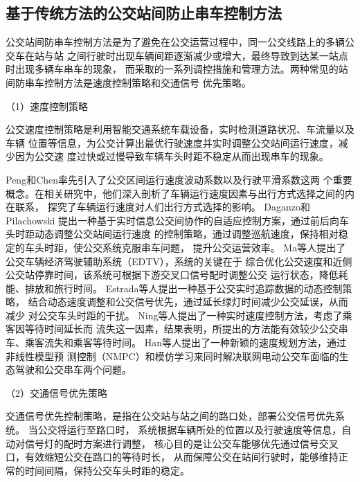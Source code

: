 \subsection{基于传统方法的公交站间防止串车控制方法}
公交站间防串车控制方法是为了避免在公交运营过程中，同一公交线路上的多辆公交车在站与站
之间行驶时出现车辆间距逐渐减少或增大，最终导致到达某一站点时出现多辆车串车的现象，
而采取的一系列调控措施和管理方法。两种常见的站间防串车控制方法是速度控制策略和交通信号
优先策略。

（1）速度控制策略

公交速度控制策略是利用智能交通系统车载设备，实时检测道路状况、车流量以及车辆
位置等信息，为公交计算出最优行驶速度并实时调整公交站间运行速度，减少因为公交速
度过快或过慢导致车辆车头时距不稳定从而出现串车的现象。

Peng和Chen\cite{peng2008improving}率先引入了公交区间运行速度波动系数以及行驶平滑系数这两
个重要概念。在相关研究中，他们深入剖析了车辆运行速度因素与出行方式选择之间的内在联系，
探究了车辆运行速度对人们出行方式选择的影响。
Daganzo和Pilachowski\cite{daganzo2011reducing}
提出一种基于实时信息公交间协作的自适应控制方案，通过前后向车头时距动态调整公交站间运行速度
的控制策略，通过调整巡航速度，保持相对稳定的车头时距，使公交系统克服串车问题，
提升公交运营效率。
Ma等人\cite{ma2012development}提出了公交车辆经济驾驶辅助系统（EDTV），系统的关键在于
综合优化公交速度和近侧公交站停靠时间，该系统可根据下游交叉口信号配时调整公交
运行状态，降低耗能、排放和旅行时间。
Estrada等人\cite{estrada2016bus}提出一种基于公交实时追踪数据的动态控制策略，
结合动态速度调整和公交信号优先，通过延长绿灯时间减少公交延误，从而减少
对公交车头时距的干扰。
Ning等人\cite{ning2024accounting}提出了一种实时速度控制方法，考虑了乘客因等待时间延长而
流失这一因素，结果表明，所提出的方法能有效较少公交串车、乘客流失和乘客等待时间。
Han等人\cite{han2025speed}提出了一种新颖的速度规划方法，通过非线性模型预
测控制（NMPC）和模仿学习来同时解决联网电动公交车面临的生态驾驶和公交串车两个问题。

（2）交通信号优先策略

交通信号优先控制策略，是指在公交站与站之间的路口处，部署公交信号优先系统。
当公交将运行至路口时，
系统根据车辆所处的位置以及行驶速度等信息，自动对信号灯的配时方案进行调整，
核心目的是让公交车能够优先通过信号交叉口，有效缩短公交在路口的等待时长，
从而保障公交在站间行驶时，能够维持正常的时间间隔，保持公交车头时距的稳定。

